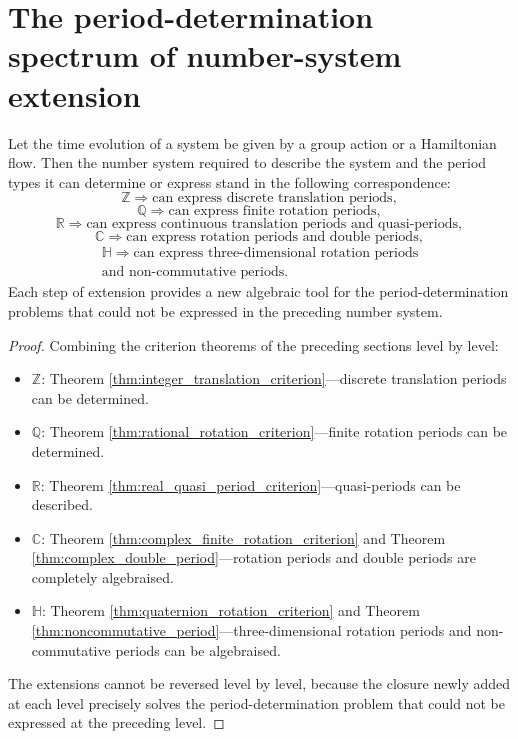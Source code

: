 \section{\texorpdfstring{The period-determination spectrum of number-system extension}{The period-determination spectrum of number-system extension}}

\begin{theorem}\label{thm:number_system_period_criterion}
Let the time evolution of a system be given by a group action or a Hamiltonian flow. Then the number system required to describe the system and the period types it can determine or express stand in the following correspondence:
\[
\mathbb{Z} \Longrightarrow \text{can express discrete translation periods},
\]
\[
\mathbb{Q} \Longrightarrow \text{can express finite rotation periods},
\]
\[
\mathbb{R} \Longrightarrow \text{can express continuous translation periods and quasi-periods},
\]
\[
\mathbb{C} \Longrightarrow \text{can express rotation periods and double periods},
\]
\[
\begin{gathered}\mathbb{H} \Longrightarrow \text{can express three-dimensional rotation periods}\\\text{and non-commutative periods}.\end{gathered}
\]
Each step of extension provides a new algebraic tool for the period-determination problems that could not be expressed in the preceding number system.
\end{theorem}

\begin{proof}
Combining the criterion theorems of the preceding sections level by level:
\begin{itemize}
    \item $\mathbb{Z}$: Theorem \ref{thm:integer_translation_criterion}---discrete translation periods can be determined.
    \item $\mathbb{Q}$: Theorem \ref{thm:rational_rotation_criterion}---finite rotation periods can be determined.
    \item $\mathbb{R}$: Theorem \ref{thm:real_quasi_period_criterion}---quasi-periods can be described.
    \item $\mathbb{C}$: Theorem \ref{thm:complex_finite_rotation_criterion} and Theorem \ref{thm:complex_double_period}---rotation periods and double periods are completely algebraised.
    \item $\mathbb{H}$: Theorem \ref{thm:quaternion_rotation_criterion} and Theorem \ref{thm:noncommutative_period}---three-dimensional rotation periods and non-commutative periods can be algebraised.
\end{itemize}
The extensions cannot be reversed level by level, because the closure newly added at each level precisely solves the period-determination problem that could not be expressed at the preceding level.
\end{proof}

